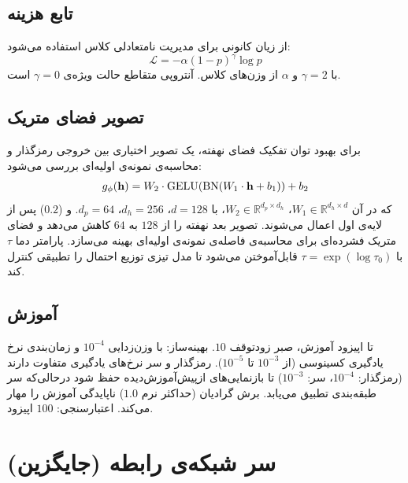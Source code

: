 \subsection{تابع هزینه}

از زیان کانونی برای مدیریت نامتعادلی کلاس استفاده می‌شود:
\begin{equation}
\mathcal{L} = -\alpha (1-p)^\gamma \log p
\end{equation}
با $\gamma = 2$ و $\alpha$ از وزن‌های کلاس. آنتروپی متقاطع حالت ویژه‌ی $\gamma = 0$ است.

\subsection{تصویر فضای متریک}

برای بهبود توان تفکیک فضای نهفته، یک  تصویر اختیاری بین خروجی رمزگذار و محاسبه‌ی نمونه‌ی اولیه‌ای بررسی می‌شود:
\begin{equation}
g_\phi(\mathbf{h}) = W_2 \cdot \text{GELU}(\text{BN}(W_1 \cdot \mathbf{h} + b_1)) + b_2
\end{equation}
که در آن $W_1 \in \mathbb{R}^{d_h \times d}$، $W_2 \in \mathbb{R}^{d_p \times d_h}$، با $d = 128$، $d_h = 256$، $d_p = 64$.  و  ($0.2$) پس از لایه‌ی اول اعمال می‌شوند. تصویر بعد نهفته را از $128$ به $64$ کاهش می‌دهد و فضای متریک فشرده‌ای برای محاسبه‌ی فاصله‌ی نمونه‌ی اولیه‌ای بهینه می‌سازد. پارامتر دما $\tau$ با $\tau = \exp(\log \tau_0)$ قابل‌آموختن می‌شود تا مدل تیزی توزیع احتمال را تطبیقی کنترل کند.

\subsection{آموزش}

تا  اپیزود آموزش، صبر زودتوقف $10$. بهینه‌ساز:  با وزن‌زدایی $10^{-4}$ و زمان‌بندی نرخ یادگیری کسینوسی (از $10^{-3}$ تا $10^{-5}$). رمزگذار و سر نرخ‌های یادگیری متفاوت دارند (رمزگذار: $10^{-4}$، سر: $10^{-3}$) تا بازنمایی‌های ازپیش‌آموزش‌دیده حفظ شود درحالی‌که سر طبقه‌بندی تطبیق می‌یابد. برش گرادیان (حداکثر نرم $1.0$) ناپایدگی آموزش را مهار می‌کند. اعتبارسنجی: $100$ اپیزود.

\section{سر شبکه‌ی رابطه (جایگزین)}

